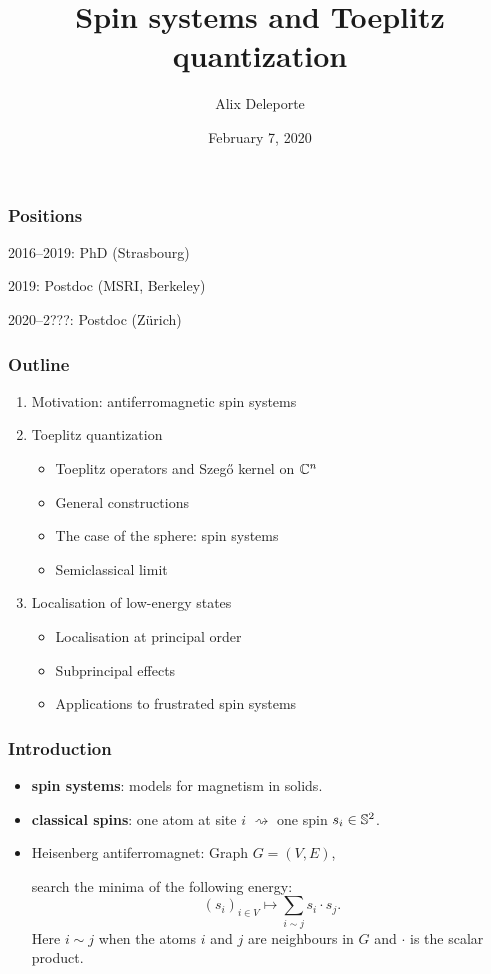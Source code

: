 \documentclass[mathserif]{beamer}
\title{Spin systems and Toeplitz quantization}
\author{Alix Deleporte}
\date{February 7, 2020}
\institute[UZH]{Institut für Mathematik\\Universität Zürich}
\begin{document}
\beamertemplatenavigationsymbolsempty

    \expandafter\def\expandafter\insertshorttitle\expandafter{%
       \insertshorttitle\hfill%
       }%


\begin{frame}
	\titlepage
      \end{frame}

      \begin{frame}
  \frametitle{Positions}
  2016--2019: PhD (Strasbourg)

  \vfill

  2019: Postdoc (MSRI, Berkeley)

  \vfill

  2020--2???: Postdoc (Zürich)
\end{frame}

      \begin{frame}
        \frametitle{Outline}
        \begin{enumerate}
        \item Motivation: antiferromagnetic spin systems
        \item Toeplitz quantization
          \begin{itemize}
          \item Toeplitz operators and Szeg\H{o} kernel on $\C^n$
          \item General constructions
          \item The case of the sphere: spin systems
          \item Semiclassical limit
          \end{itemize}
        \item Localisation of low-energy states
          \begin{itemize}
          \item Localisation at principal order
          \item Subprincipal effects
          \item Applications to frustrated spin systems
          \end{itemize}
        \end{enumerate}
      \end{frame}

\begin{frame}
  \frametitle{Introduction}
  \begin{itemize}
  \item {\bfseries spin systems}: models for magnetism in solids.
  \item {\bfseries classical spins}: one atom at site $i$
    $\rightsquigarrow$ one spin $s_i\in \S^2$.
  \item Heisenberg antiferromagnet: Graph $G=(V,E)$,
    
    search the minima of the following energy:
    \[
      (s_i)_{i\in V}\mapsto\sum_{i\sim j}s_i\cdot s_j.
    \]
    Here $i\sim j$ when the atoms $i$ and $j$ are neighbours in $G$
    and $\cdot$ is the scalar product.
  \end{itemize}
\end{frame}
\end{document}
